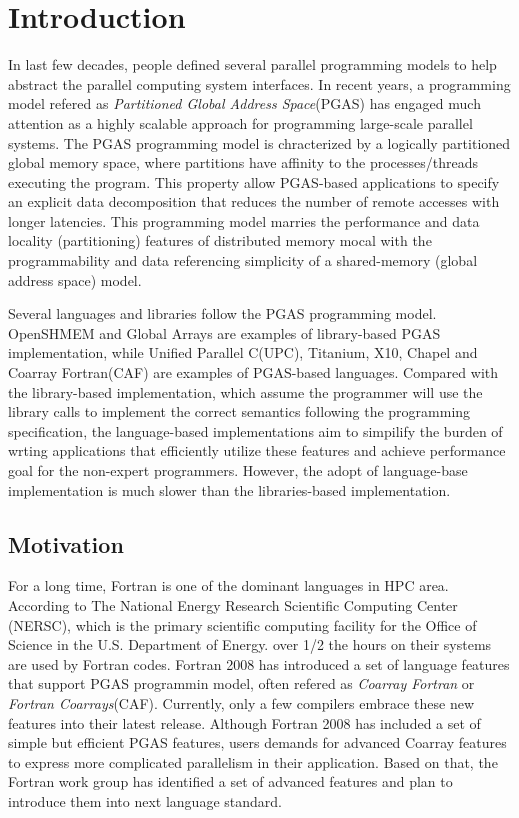 \chapter{Introduction}\label{chap:Intro}
In last few decades, people defined several parallel programming models to help abstract the parallel computing system interfaces. In recent years, a programming model refered as  \textit{Partitioned Global Address Space}(PGAS) has engaged much attention as a highly scalable approach for programming large-scale parallel systems. The PGAS programming model is chracterized by a logically partitioned global memory space, where partitions have affinity to the processes/threads executing the program. This property allow PGAS-based applications to specify an explicit data decomposition that reduces the number of remote accesses with longer latencies. This programming model marries the performance and data locality (partitioning) features of distributed memory mocal with the programmability and data referencing simplicity of a shared-memory (global address space) model. 

Several languages and libraries follow the PGAS programming model. OpenSHMEM\cite{chapman2010introducing} and Global Arrays\cite{nieplocha1994global} are examples of library-based PGAS implementation, while Unified Parallel C(UPC)\cite{carlson1999introduction}, Titanium\cite{hilfinger2005titanium}, X10\cite{charles2005x10}, Chapel\cite{chamberlain2007parallel} and Coarray Fortran(CAF)\cite{numrich1998co} are examples of PGAS-based languages. Compared with the library-based implementation, which assume the programmer will use the library calls to implement the correct semantics following the programming specification, the language-based implementations aim to simpilify the burden of wrting applications that efficiently utilize these features and achieve performance goal for the non-expert programmers. However, the adopt of language-base implementation is much slower than the libraries-based implementation. 

\section{Motivation}
For a long time, Fortran is one of the dominant languages in HPC area. According to The National Energy Research Scientific Computing Center (NERSC), which is the primary scientific computing facility for the Office of Science in the U.S. Department of Energy.  over 1/2 the hours on their systems are used by Fortran codes. Fortran 2008 has introduced a set of language features that support PGAS programmin model, often refered as \textit{Coarray Fortran} or \textit{Fortran Coarrays}(CAF). Currently, only a few compilers embrace these new features into their latest release. Although Fortran 2008 has included a set of simple but efficient PGAS features, users demands for advanced Coarray features to express more complicated parallelism in their application. Based on that, the Fortran work group has identified a set of advanced features and plan to introduce them into next language standard\cite{caf-spec}. 

